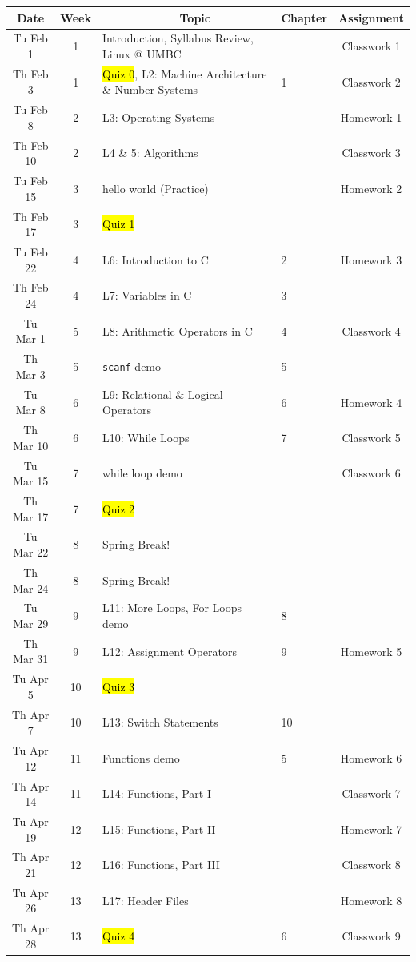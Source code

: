 \documentclass[letter,11pt]{article}
\begin{document}
\iffalse %
\small
\begin{tabular}{c c l l c}
Date & Week & ~~~~~~~~~~~~Topic & Chapter & Assignment \\
\hline
Tu Feb 1  & 1 & Introduction, Syllabus Review, Linux @ UMBC & & Classwork 1  \\
Th Feb 3  & 1 & \hl{Quiz 0}, L2: Machine Architecture \& Number Systems & 1 & Classwork 2 \\
Tu Feb 8  & 2 & L3: Operating Systems & & Homework 1 \\
Th Feb 10 & 2 & L4 \& 5: Algorithms & & Classwork 3 \\
Tu Feb 15 & 3 & hello world (Practice) & & Homework 2 \\
Th Feb 17 & 3 & \hl{Quiz 1} & &  \\
Tu Feb 22 & 4 & L6: Introduction to C & 2 & Homework 3\\
Th Feb 24 & 4 & L7: Variables in C & 3 \\ \hline

Tu Mar 1 & 5 & L8: Arithmetic Operators in C & 4 & Classwork 4 \\
Th Mar 3 & 5 & \texttt{scanf} demo & 5 &  \\
Tu Mar 8 & 6 & L9: Relational \& Logical Operators & 6 & Homework 4 \\
Th Mar 10 & 6 & L10: While Loops & 7 & Classwork 5 \\
Tu Mar 15 & 7 & while loop demo & & Classwork 6 \\
Th Mar 17 & 7 & \hl{Quiz 2} & & \\
Tu Mar 22 & 8 & {\color{cadmiumgreen}Spring Break!} & & \\
Th Mar 24 & 8 & {\color{cadmiumgreen}Spring Break!} & &  \\
Tu Mar 29 & 9 & L11: More Loops, For Loops demo & 8 &  \\
Th Mar 31 & 9 & L12: Assignment Operators & 9 & Homework 5\\ \hline

Tu Apr 5 & 10 & \hl{Quiz 3} & & \\
Th Apr 7 & 10 & L13: Switch Statements & 10 & \\
Tu Apr 12 & 11 & Functions demo & 5 & Homework 6\\
Th Apr 14 & 11 & L14: Functions, Part I & & Classwork 7  \\
Tu Apr 19 & 12 & L15: Functions, Part II & &  Homework 7 \\
Th Apr 21 & 12 & L16: Functions, Part III  & & Classwork 8 \\
Tu Apr 26 & 13 & L17: Header Files & & Homework 8\\
Th Apr 28 & 13 & \hl{Quiz 4} & 6 & Classwork 9 \\ \hline


\end{tabular}
\end{document}
